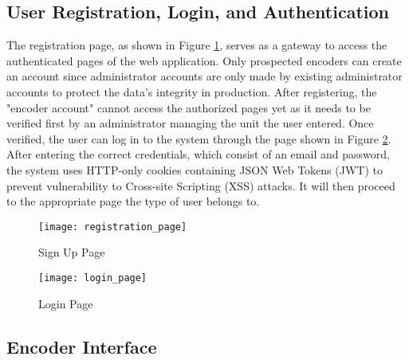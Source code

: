 \subsection{User Registration, Login, and Authentication}
The registration page, as shown in Figure \ref{fig:registration_page}, serves as a gateway to access the authenticated pages of the web application. Only prospected encoders can create an account since administrator accounts are only made by existing administrator accounts to protect the data's integrity in production. After registering, the "encoder account" cannot access the authorized pages yet as it needs to be verified first by an administrator managing the unit the user entered. Once verified, the user can log in to the system through the page shown in Figure \ref{fig:login_page}. After entering the correct credentials, which consist of an email and password, the system uses HTTP-only cookies containing JSON Web Tokens (JWT) to prevent vulnerability to Cross-site Scripting (XSS) attacks. It will then proceed to the appropriate page the type of user belongs to. 
\begin{figure}[H]
	\centering
	\texttt{[image: registration\_page]}
	\caption{Sign Up Page}
	\label{fig:registration_page}
\end{figure}

\begin{figure}[H]
	\centering
	\texttt{[image: login\_page]}
	\caption{Login Page}
	\label{fig:login_page}
\end{figure}

\subsection{Encoder Interface}
